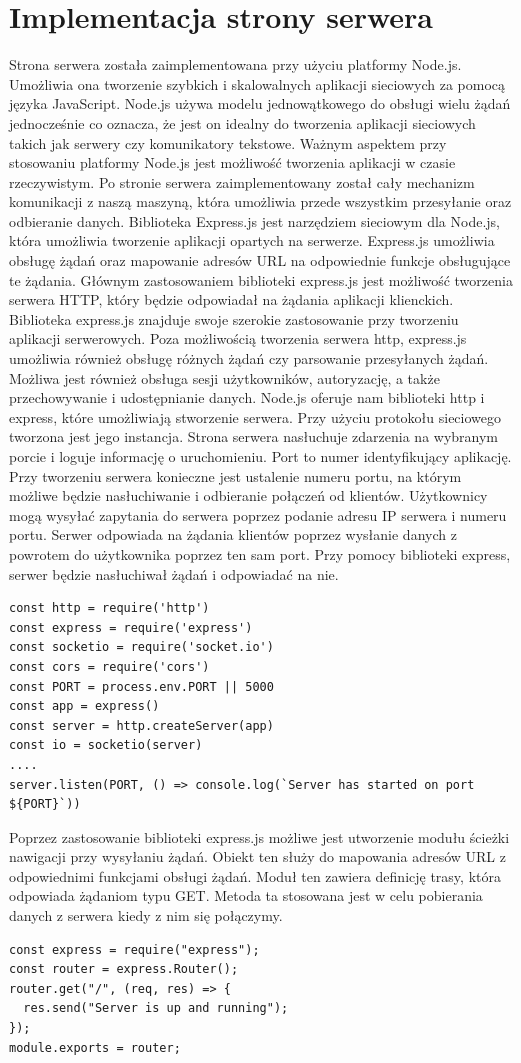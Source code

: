 \section{Implementacja strony serwera}
Strona serwera została zaimplementowana przy użyciu platformy Node.js. Umożliwia ona tworzenie szybkich i skalowalnych aplikacji sieciowych za pomocą języka JavaScript. Node.js używa modelu jednowątkowego do obsługi wielu żądań jednocześnie co oznacza, że jest on idealny do tworzenia aplikacji sieciowych takich jak serwery czy komunikatory tekstowe. Ważnym aspektem przy stosowaniu platformy Node.js jest możliwość tworzenia aplikacji w czasie rzeczywistym. Po stronie serwera zaimplementowany został cały mechanizm komunikacji z naszą maszyną, która umożliwia przede wszystkim przesyłanie oraz odbieranie danych.
Biblioteka Express.js  jest narzędziem sieciowym dla Node.js, która umożliwia tworzenie aplikacji opartych na serwerze. Express.js umożliwia obsługę żądań oraz mapowanie adresów URL na odpowiednie funkcje obsługujące te żądania. Głównym zastosowaniem biblioteki express.js jest możliwość tworzenia serwera HTTP, który będzie odpowiadał na żądania aplikacji klienckich. Biblioteka express.js znajduje swoje szerokie zastosowanie przy tworzeniu aplikacji serwerowych. Poza możliwością tworzenia serwera http, express.js umożliwia również obsługę różnych żądań czy parsowanie przesyłanych żądań. Możliwa jest również obsługa sesji użytkowników, autoryzację, a także przechowywanie i udostępnianie danych.
Node.js oferuje nam biblioteki http i express, które umożliwiają stworzenie serwera. Przy użyciu protokołu sieciowego tworzona jest jego instancja. Strona serwera nasłuchuje zdarzenia na wybranym porcie i loguje informację o uruchomieniu. Port to numer identyfikujący aplikację. Przy tworzeniu serwera konieczne jest ustalenie numeru portu, na którym możliwe będzie nasłuchiwanie i odbieranie połączeń od klientów. Użytkownicy mogą wysyłać zapytania do serwera poprzez podanie adresu IP serwera i numeru portu. Serwer odpowiada na żądania klientów poprzez wysłanie danych z powrotem do użytkownika poprzez ten sam port. Przy pomocy biblioteki express, serwer będzie nasłuchiwał żądań i odpowiadać na nie. 
\begin{lstlisting}[caption=Implementacja serwera]
const http = require('http')
const express = require('express')
const socketio = require('socket.io')
const cors = require('cors')
const PORT = process.env.PORT || 5000
const app = express()
const server = http.createServer(app)
const io = socketio(server)
....
server.listen(PORT, () => console.log(`Server has started on port ${PORT}`))
\end{lstlisting}
Poprzez zastosowanie biblioteki express.js możliwe jest utworzenie modułu ścieżki nawigacji przy wysyłaniu żądań. Obiekt ten służy do mapowania adresów URL z odpowiednimi funkcjami obsługi żądań. Moduł ten zawiera definicję trasy, która odpowiada żądaniom typu GET. Metoda ta stosowana jest w celu pobierania danych z serwera kiedy z nim się połączymy.
\begin{lstlisting}[caption=Implementacja sciezki serwera]
const express = require("express");
const router = express.Router();
router.get("/", (req, res) => {
  res.send("Server is up and running");
});
module.exports = router;
\end{lstlisting}
